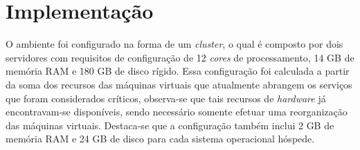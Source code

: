 



\section{Implementação}
\label{section:implementacao}


O ambiente foi configurado na forma de um \textit{cluster}, o qual é composto por dois servidores com requisitos de configuração 
de 12 \textit{cores} de processamento, 14 GB de memória \ac{RAM} e 180 GB de disco rígido.
Essa configuração foi calculada a partir da soma dos recursos das máquinas virtuais que atualmente abrangem os serviços que foram considerados 
críticos, observa-se que tais recursos de \textit{hardware} já encontravam-se disponíveis, sendo necessário somente efetuar uma reorganização 
das máquinas virtuais. Destaca-se que a configuração também inclui 2 GB de memória \ac{RAM} e 24 GB de disco para cada sistema operacional hóspede.

